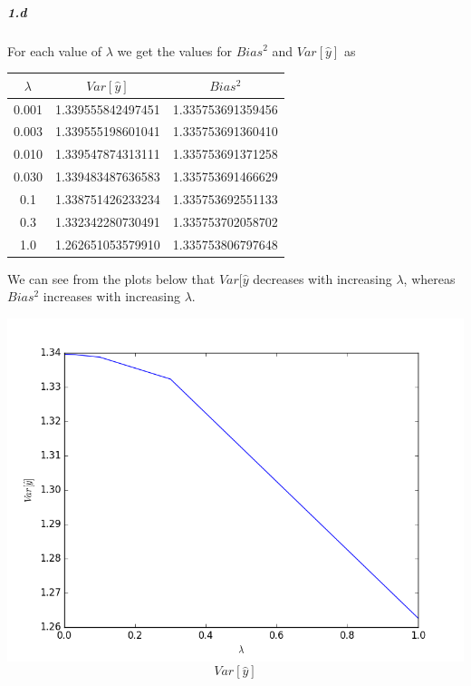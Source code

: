 \documentclass[]{report}
\begin{document}
\subparagraph{1.d}
	For each value of $\lambda$ we get the values for $Bias^2$ and $Var[\hat{y}]$ as 
	\begin{center}
		\begin{tabular}{c|c|c}
			\hline
			           $\lambda$ &    $Var[\hat{y}]$ &          $Bias^2$ \\
			\hline
			 0.001 & 1.339555842497451 & 1.335753691359456 \\
			 0.003 & 1.339555198601041 & 1.335753691360410 \\
			 0.010 & 1.339547874313111 & 1.335753691371258 \\
			 0.030 & 1.339483487636583 & 1.335753691466629 \\
			 0.1   & 1.338751426233234 & 1.335753692551133 \\
			 0.3   & 1.332342280730491 & 1.335753702058702 \\
			 1.0   & 1.262651053579910 & 1.335753806797648 \\
			\hline
		\end{tabular}
	\end{center}

	We can see from the plots below that $Var[\hat{y}$ decreases with increasing $\lambda$, whereas $Bias^2$ increases with increasing $\lambda$.

	\begin{center}
		
		\includegraphics[width=\textwidth]{var_lambda}
		\[ Var[\hat{y}] \]
	\end{center}
	
\end{document}
